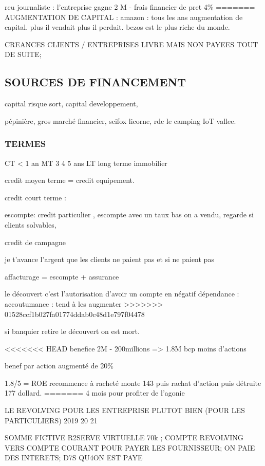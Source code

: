 \documentclass[a4paper,12pt]{article}
\begin{document}
reu journaliste : l'entreprise gagne 2 M - frais financier de pret 4\%
=======
AUGMENTATION DE CAPITAL :
amazon : tous les ans augmentation de capital.
plus il vendait plus il perdait. bezos est le plus riche du monde.


CREANCES CLIENTS / ENTREPRISES LIVRE MAIS NON PAYEES TOUT DE SUITE;

\subsection{SOURCES DE FINANCEMENT}

capital risque sort, capital developpement,

pépinière, gros marché financier, scifox licorne, rdc le camping IoT vallee.

\subsubsection{TERMES}
 CT < 1 an
 MT 3 4 5 ans
 LT long terme immobilier


credit moyen terme = credit equipement.

credit court terme :

escompte: credit particulier , escompte avec un taux bas
on a vendu, regarde si clients solvables,

credit de campagne

je t'avance l'argent que les clients ne paient pas et si ne paient pas

affacturage = escompte + assurance



le découvert c'est l'autorisation d'avoir un compte en négatif
dépendance : 
accoutumance : tend à les augmenter
>>>>>>> 01528ccf1b027fa01774ddab0c48d1e797f04478

si banquier retire le découvert on est mort.

<<<<<<< HEAD
benefice 2M - 200millions => 1.8M  bcp moins d'actions

benef par action augmenté de 20\%

1.8/5 = ROE
recommence à racheté monte 143 puis rachat d'action puis détruite 177 dollard.
=======
4 mois pour profiter de l'agonie


LE REVOLVING POUR LES ENTREPRISE PLUTOT BIEN (POUR LES PARTICULIERS)
2019 20 21

SOMME FICTIVE R2SERVE VIRTUELLE 70k ;  COMPTE REVOLVING VERS COMPTE COURANT POUR PAYER LES FOURNISSEUR;
ON PAIE DES INTERETS; D7S QU4ON EST PAYE 
\end{document}
